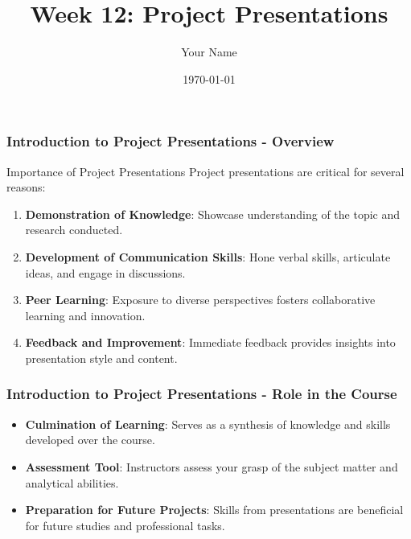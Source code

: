 \documentclass{beamer}
\title{Week 12: Project Presentations}
\author{Your Name}
\institute{Your Institution}
\date{\today}
\begin{document}
\frame{\titlepage}

\begin{frame}[fragile]
    \frametitle{Introduction to Project Presentations - Overview}
    \begin{block}{Importance of Project Presentations}
        Project presentations are critical for several reasons:
        \begin{enumerate}
            \item \textbf{Demonstration of Knowledge}: Showcase understanding of the topic and research conducted.
            \item \textbf{Development of Communication Skills}: Hone verbal skills, articulate ideas, and engage in discussions.
            \item \textbf{Peer Learning}: Exposure to diverse perspectives fosters collaborative learning and innovation.
            \item \textbf{Feedback and Improvement}: Immediate feedback provides insights into presentation style and content.
        \end{enumerate}
    \end{block}
\end{frame}

\begin{frame}[fragile]
    \frametitle{Introduction to Project Presentations - Role in the Course}
    \begin{itemize}
        \item \textbf{Culmination of Learning}: Serves as a synthesis of knowledge and skills developed over the course.
        \item \textbf{Assessment Tool}: Instructors assess your grasp of the subject matter and analytical abilities.
        \item \textbf{Preparation for Future Projects}: Skills from presentations are beneficial for future studies and professional tasks.
    \end{itemize}
\end{frame}
\end{document}
